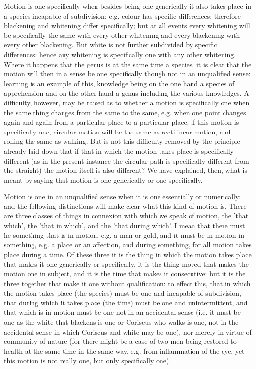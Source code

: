 Motion is one specifically when besides being one generically it also
takes place in a species incapable of subdivision: e.g. colour has
specific differences: therefore blackening and whitening differ specifically;
but at all events every whitening will be specifically the same with
every other whitening and every blackening with every other blackening.
But white is not further subdivided by specific differences: hence
any whitening is specifically one with any other whitening. Where
it happens that the genus is at the same time a species, it is clear
that the motion will then in a sense be one specifically though not
in an unqualified sense: learning is an example of this, knowledge
being on the one hand a species of apprehension and on the other hand
a genus including the various knowledges. A difficulty, however, may
be raised as to whether a motion is specifically one when the same
thing changes from the same to the same, e.g. when one point changes
again and again from a particular place to a particular place: if
this motion is specifically one, circular motion will be the same
as rectilinear motion, and rolling the same as walking. But is not
this difficulty removed by the principle already laid down that if
that in which the motion takes place is specifically different (as
in the present instance the circular path is specifically different
from the straight) the motion itself is also different? We have explained,
then, what is meant by saying that motion is one generically or one
specifically. 

Motion is one in an unqualified sense when it is one essentially or
numerically: and the following distinctions will make clear what this
kind of motion is. There are three classes of things in connexion
with which we speak of motion, the 'that which', the 'that in which',
and the 'that during which'. I mean that there must he something that
is in motion, e.g. a man or gold, and it must be in motion in something,
e.g. a place or an affection, and during something, for all motion
takes place during a time. Of these three it is the thing in which
the motion takes place that makes it one generically or specifically,
it is the thing moved that makes the motion one in subject, and it
is the time that makes it consecutive: but it is the three together
that make it one without qualification: to effect this, that in which
the motion takes place (the species) must be one and incapable of
subdivision, that during which it takes place (the time) must be one
and unintermittent, and that which is in motion must be one-not in
an accidental sense (i.e. it must be one as the white that blackens
is one or Coriscus who walks is one, not in the accidental sense in
which Coriscus and white may be one), nor merely in virtue of community
of nature (for there might be a case of two men being restored to
health at the same time in the same way, e.g. from inflammation of
the eye, yet this motion is not really one, but only specifically
one). 

